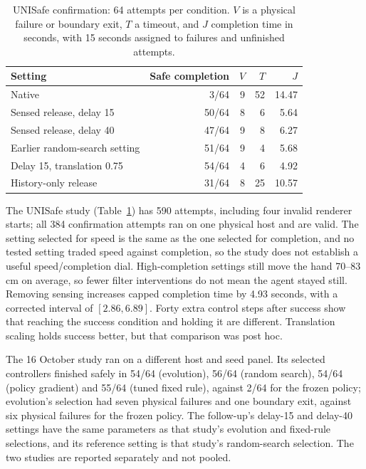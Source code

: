 \documentclass[sigconf,nonacm]{acmart}
\begin{document}
\begin{table}[htbp]
\caption{UNISafe confirmation: 64 attempts per condition. $V$ is a physical
failure or boundary exit, $T$ a timeout, and $J$ completion time in seconds,
with 15 seconds assigned to failures and unfinished attempts.}
\label{tab:unisafe}\centering\small
\begin{tabular}{lrrrr}
\toprule
Setting & Safe completion & $V$ & $T$ & $J$ \\
\midrule
Native & 3/64 & 9 & 52 & 14.47 \\
Sensed release, delay 15 & 50/64 & 8 & 6 & 5.64 \\
Sensed release, delay 40 & 47/64 & 9 & 8 & 6.27 \\
Earlier random-search setting & 51/64 & 9 & 4 & 5.68 \\
Delay 15, translation 0.75 & 54/64 & 4 & 6 & 4.92 \\
History-only release & 31/64 & 8 & 25 & 10.57 \\
\bottomrule
\end{tabular}
\end{table}

The UNISafe study (Table~\ref{tab:unisafe}) has 590 attempts, including
four invalid renderer starts; all 384 confirmation attempts ran on one
physical host and are valid. The setting selected for speed is the same as the one selected for
completion, and no tested setting traded speed against completion, so the
study does not establish a useful speed/completion dial. High-completion settings still move the hand 70--83 cm
on average, so fewer filter interventions do not mean the agent stayed
still. Removing sensing increases capped completion time by 4.93 seconds,
with a corrected interval of $[2.86,6.89]$. Forty extra control steps after
success show that reaching the success condition and holding it are
different. Translation scaling holds success better, but that comparison
was post hoc.

The 16 October study ran on a different host and seed panel. Its selected
controllers finished safely in 54/64 (evolution), 56/64 (random search),
54/64 (policy gradient) and 55/64 (tuned fixed rule), against 2/64 for the
frozen policy; evolution's selection had seven physical failures and one
boundary exit, against six physical failures for the frozen policy. The
follow-up's delay-15 and delay-40 settings have the same parameters as that
study's evolution and fixed-rule selections, and its reference setting is
that study's random-search selection. The two studies are reported
separately and not pooled.
\end{document}
